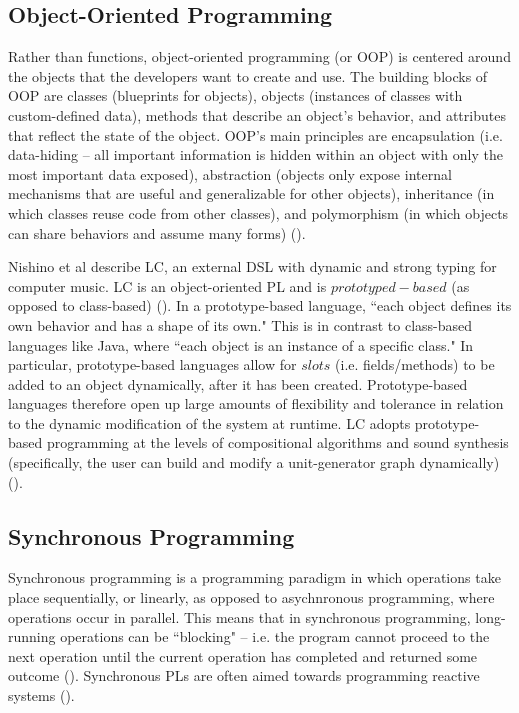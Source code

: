 \documentclass{report}
\newcommand\citeparen[1]{(\cite{#1})}
\begin{document}
\subsection{Object-Oriented Programming}
Rather  than functions, object-oriented programming (or OOP) is centered around the objects that the developers want to create and  use. The  building blocks  of OOP  are  classes (blueprints for  objects),  objects (instances  of classes with custom-defined data),  methods that describe an object's behavior,  and  attributes that reflect the state of the  object. OOP's main  principles are encapsulation  (i.e. data-hiding -- all important information  is  hidden within  an  object with  only the  most  important data  exposed),  abstraction  (objects only  expose internal mechanisms  that are  useful and  generalizable for other  objects), inheritance (in which classes reuse  code  from other classes),  and polymorphism (in which objects  can  share behaviors and assume many forms) \citeparen{gillis_lewis_2021}.

Nishino et al describe LC, an  external DSL with dynamic and strong typing for computer music. LC is  an object-oriented PL and is $prototyped-based$ (as opposed  to  class-based) \citeparen{nishino_osaka_nakatsu_2013}. In a prototype-based language, ``each object defines its own behavior and has a shape of its own." This is in contrast to class-based languages like Java, where ``each object is an instance of a specific class." In particular, prototype-based languages allow for $slots$ (i.e. fields/methods)  to be  added  to an  object  dynamically, after it  has been  created. Prototype-based languages therefore open up large amounts of flexibility and tolerance  in relation to the dynamic modification of the system at runtime. LC adopts prototype-based programming at the levels of compositional algorithms  and sound synthesis (specifically, the user can build and modify a unit-generator graph dynamically) \citeparen{nishino_osaka_nakatsu_2014}.

\subsection{Synchronous Programming}
Synchronous  programming is a programming paradigm in which operations take  place  sequentially, or linearly, as opposed to asychnronous programming,  where operations  occur in parallel. This means that in synchronous programming, long-running operations can be ``blocking" -- i.e. the program cannot proceed to the next operation until the current operation has completed and returned some outcome \citeparen{deepsource}. Synchronous PLs are often aimed towards programming reactive systems \citeparen{petit_serrano_2020}.
\end{document}
